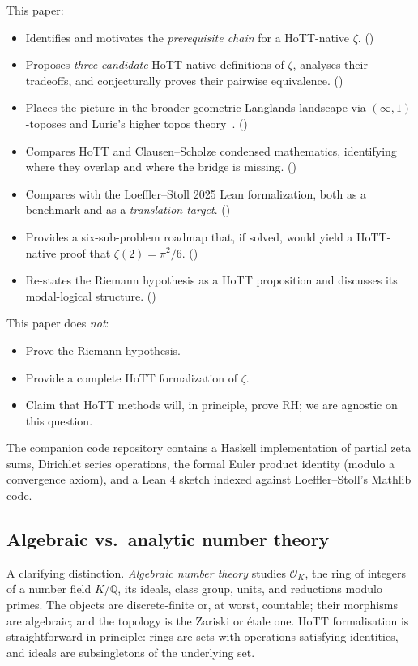 \documentclass[12pt]{article}
\theoremstyle{definition}
\theoremstyle{remark}
\newcommand{\Q}{\mathbb{Q}}
\begin{document}
This paper:
\begin{itemize}
\item Identifies and motivates the \emph{prerequisite chain} for a HoTT-native
$\zeta$. ()
\item Proposes \emph{three candidate} HoTT-native definitions of $\zeta$,
analyses their tradeoffs, and conjecturally proves their pairwise
equivalence. ()
\item Places the picture in the broader geometric Langlands landscape via
$(\infty,1)$-toposes and Lurie's higher topos theory~\cite{Lurie2009HTT,
Gaitsgory2024GLC}. ()
\item Compares HoTT and Clausen--Scholze condensed mathematics, identifying
where they overlap and where the bridge is missing. ()
\item Compares with the Loeffler--Stoll 2025 Lean formalization, both as a
benchmark and as a \emph{translation target}. ()
\item Provides a six-sub-problem roadmap that, if solved, would yield a
HoTT-native proof that $\zeta(2) = \pi^2/6$. ()
\item Re-states the Riemann hypothesis as a HoTT proposition and discusses
its modal-logical structure. ()
\end{itemize}

This paper does \emph{not}:
\begin{itemize}
\item Prove the Riemann hypothesis.
\item Provide a complete HoTT formalization of $\zeta$.
\item Claim that HoTT methods will, in principle, prove RH; we are agnostic
on this question.
\end{itemize}

The companion code repository contains a Haskell implementation of partial
zeta sums, Dirichlet series operations, the formal Euler product identity
(modulo a convergence axiom), and a Lean 4 sketch indexed against
Loeffler--Stoll's Mathlib code.

\subsection{Algebraic vs.\ analytic number theory}

A clarifying distinction. \emph{Algebraic number theory} studies
$\mathcal{O}_K$, the ring of integers of a number field $K/\Q$, its ideals,
class group, units, and reductions modulo primes. The objects are
discrete-finite or, at worst, countable; their morphisms are algebraic; and
the topology is the Zariski or étale one. HoTT formalisation is
straightforward in principle: rings are sets with operations satisfying
identities, and ideals are subsingletons of the underlying set.
\end{document}
